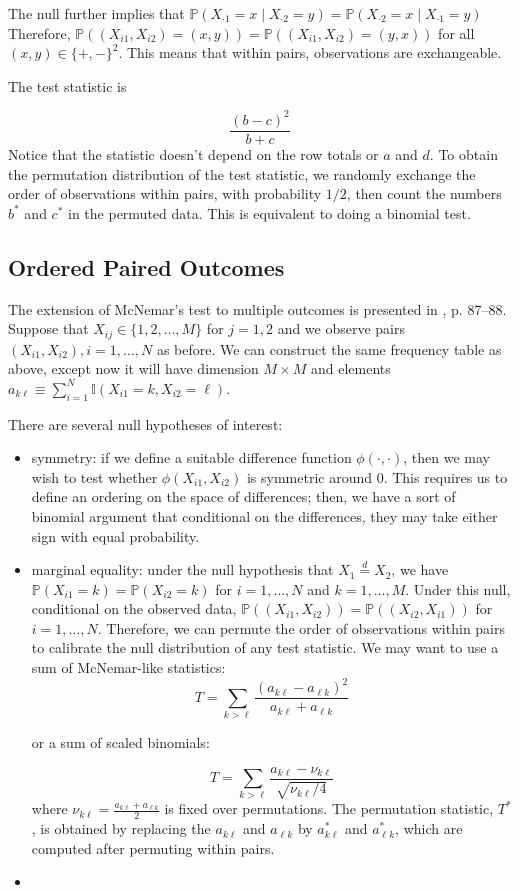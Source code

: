 \documentclass[12pt]{article}
\newcommand{\todo}[1]{{\color{red}{TO DO: \sc #1}}}
\newcommand{\ind}{\mathbb{I}} %
\newcommand{\pr}{\mathbb{P}} %
\newcommand{\eqd}{\stackrel{d}{=}} %
\begin{document}
The null further implies that $\pr(X_{\cdot 1} = x \mid X_{\cdot 2} = y) = \pr(X_{\cdot 2} = x \mid X_{\cdot 1} = y)$
Therefore, $\pr((X_{i1}, X_{i2}) = (x, y)) = \pr((X_{i1}, X_{i2}) = (y, x))$ for all $(x, y) \in \{ +, - \}^2$.
This means that within pairs, observations are exchangeable.


The test statistic is

$$\frac{(b-c)^2}{b+c}$$
Notice that the statistic doesn't depend on the row totals or $a$ and $d$.
To obtain the permutation distribution of the test statistic, we randomly exchange the order of observations within pairs, with probability $1/2$, then count the numbers $b^*$ and $c^*$ in the permuted data.
This is equivalent to doing a binomial test.

\subsection{Ordered Paired Outcomes}
The extension of McNemar's test to multiple outcomes is presented in \citet{pesarin_permutation_2010}, p. 87--88.
Suppose that $X_{ij} \in \{1, 2, \dots, M\}$ for $j=1, 2$ and we observe pairs $(X_{i1}, X_{i2}), i=1,\dots,N$ as before.
We can construct the same frequency table as above, except now it will have dimension $M \times M$ and elements $a_{k\ell} \equiv \sum_{i=1}^N \ind{(X_{i1} = k, X_{i2} = \ell)}$.

There are several null hypotheses of interest:
\begin{itemize}
\item symmetry: if we define a suitable difference function $\phi(\cdot, \cdot)$, then we may wish to test whether $\phi(X_{i1}, X_{i2})$ is symmetric around 0.
This requires us to define an ordering on the space of differences;
then, we have a sort of binomial argument that conditional on the differences, they may take either sign with equal probability.
\todo{flesh out}
\item marginal equality: under the null hypothesis that $X_1 \eqd X_2$, we have $\pr(X_{i1} = k) = \pr(X_{i2} = k)$ for $i = 1, \dots, N$ and $k = 1, \dots, M$.
Under this null, conditional on the observed data, $\pr( (X_{i1}, X_{i2})) = \pr((X_{i2}, X_{i1}))$ for $i=1,\dots, N$.
Therefore, we can permute the order of observations within pairs to calibrate the null distribution of any test statistic.
We may want to use a sum of McNemar-like statistics:
$$T = \sum_{k > \ell} \frac{(a_{k \ell} - a_{\ell k})^2}{a_{k \ell} + a_{\ell k}}$$

or a sum of scaled binomials:

$$T = \sum_{k > \ell} \frac{ a_{k \ell} - \nu_{k \ell}}{\sqrt{\nu_{k \ell}/4}}$$
where $\nu_{k \ell} = \frac{a_{k \ell} + a_{\ell k}}{2}$ is fixed over permutations.
The permutation statistic, $T^*$, is obtained by replacing the $a_{k \ell}$ and $a_{\ell k}$ by $a_{k \ell}^*$ and $a_{\ell k}^*$, which are computed after permuting within pairs.
\item \todo{test statistic from \citet{stuart_test_1955}}
\end{itemize}
\end{document}
